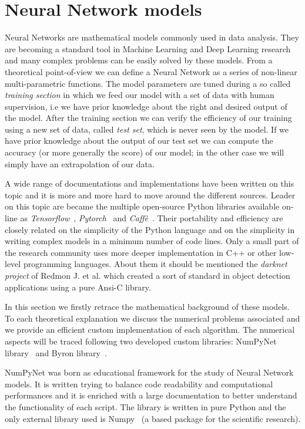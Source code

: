 \documentclass{standalone}
\begin{document}
\section[Neural Network models]{Neural Network models}\label{nn}

Neural Networks are mathematical models commonly used in data analysis.
They are becoming a standard tool in Machine Learning and Deep Learning research and many complex problems can be easily solved by these models.
From a theoretical point-of-view we can define a Neural Network as a series of non-linear multi-parametric functions.
The model parameters are tuned during a so called \emph{training section} in which we feed our model with a set of data with human supervision, i.e we have prior knowledge about the right and desired output of the model.
After the training section we can verify the efficiency of our training using a new set of data, called \emph{test set}, which is never seen by the model.
If we have prior knowledge about the output of our test set we can compute the accuracy (or more generally the score) of our model; in the other case we will simply have an extrapolation of our data.

A wide range of documentations and implementations have been written on this topic and it is more and more hard to move around the different sources.
Leader on this topic are became the multiple open-source Python libraries available on-line as \emph{Tensorflow}~\cite{tensorflow2015-whitepaper}, \emph{Pytorch}~\cite{paszke2017automatic} and \emph{Caffè}~\cite{Jia:2014:Caffe}.
Their portability and efficiency are closely related on the simplicity of the Python language and on the simplicity in writing complex models in a minimum number of code lines.
Only a small part of the research community uses more deeper implementation in C++ or other low-level programming languages.
About them it should be mentioned the \emph{darknet project} of Redmon J. et al. which created a sort of standard in object detection applications using a pure Ansi-C library.

In this section we firstly retrace the mathematical background of these models.
To each theoretical explanation we discuss the numerical problems associated and we provide an efficient custom implementation of each algorithm.
The numerical aspects will be traced following two  developed custom libraries: NumPyNet library~\cite{NumPyNet} and Byron library~\cite{Byron}.

NumPyNet was born as educational framework for the study of Neural Network models.
It is written trying to balance code readability and computational performances and it is enriched with a large documentation to better understand the functionality of each script.
The library is written in pure Python and the only external library used is Numpy~\cite{Numpy} (a based package for the scientific research).
\end{document}
